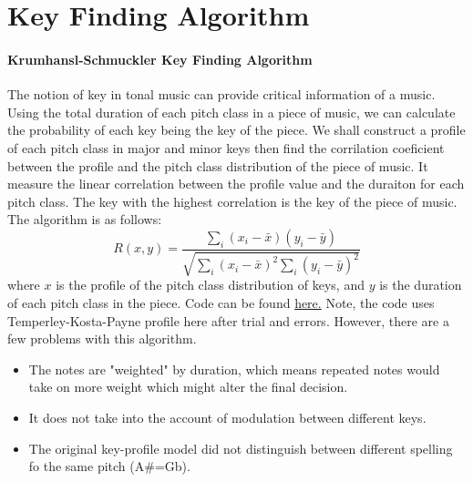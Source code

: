 \documentclass[12pt]{report}
\theoremstyle{definition}
\begin{document}
\section*{Key Finding Algorithm}
\paragraph*{Krumhansl-Schmuckler Key Finding Algorithm}
The notion of key in tonal music can provide critical information of a music. Using the total duration
of each pitch class in a piece of music, we can calculate the probability of each key being the key of the
piece. We shall construct a profile of each pitch class in major and minor keys 
then find the corrilation coeficient between the profile and the pitch class distribution of the piece of music.
It measure the linear correlation between the profile value and the duraiton for each pitch class.
The key with the highest correlation is the key of the piece of music. The algorithm is as follows:
\[R(x,y)=\frac{\sum_i(x_i-\bar{x})(y_i-\bar{y})}{\sqrt{\sum_i(x_i-\bar{x})^2\sum_i(y_i-\bar{y})^2}}\]
where $x$ is the profile of the pitch class distribution of keys, and $y$ is 
the duration of each pitch class in the piece. Code can be found 
\href{https://github.com/StefanHeng/Symbolic-Music-Generation/blob/master/musicnlp/preprocess/key_finder.py}{here.}
Note, the code uses Temperley-Kosta-Payne profile here after trial and errors.
However, there are a few problems with this algorithm.
\begin{itemize}
    \item The notes are "weighted" by duration, which means repeated notes would take
    on more weight which might alter the final decision.
    \item It does not take into the account of modulation between different keys.
    \item The original key-profile model did not distinguish between different spelling fo
    the same pitch (A\#=Gb).
\end{itemize}
\end{document}
